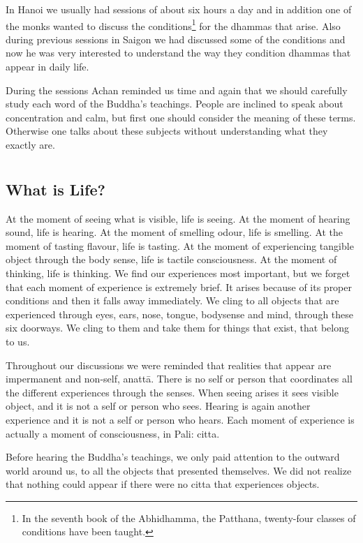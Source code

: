 In Hanoi we usually had sessions of about six hours a day and in addition one of 
the monks wanted to discuss the conditions\footnote{In the seventh book of the Abhidhamma, the Patthana, twenty-four classes of conditions have been taught.} for the dhammas that arise. Also 
during previous sessions in Saigon we had discussed some of the conditions and 
now he was very interested to understand the way they condition dhammas that 
appear in daily life. 

During the sessions Achan reminded us time and again that we should carefully 
study each word of the Buddha's teachings. People are inclined to speak about 
concentration and calm, but first one should consider the meaning of these 
terms. Otherwise one talks about these subjects without understanding what 
they exactly are. 

\chapter[What is Life?]{}
\section*{What is Life?}

At the moment of seeing what is visible, life is seeing. At the moment of hearing sound, life is hearing. At the moment of smelling odour, life is smelling. At 
the moment of tasting flavour, life is tasting. At the moment of experiencing 
tangible object through the body sense, life is tactile consciousness. At the moment of thinking, life is thinking. We find our experiences most important, but 
we forget that each moment of experience is extremely brief. It arises because 
of its proper conditions and then it falls away immediately. We cling to all objects that are experienced through eyes, ears, nose, tongue, bodysense and mind, 
through these six doorways. We cling to them and take them for things that exist, that belong to us. 

Throughout our discussions we were reminded that realities that appear are impermanent and non-self, anattā. There is no self or person that coordinates all 
the different experiences through the senses. When seeing arises it sees visible 
object, and it is not a self or person who sees. Hearing is again another experience and it is not a self or person who hears. Each moment of experience is actually a moment of consciousness, in Pali: citta. 

Before hearing the Buddha's teachings, we only paid attention to the outward 
world around us, to all the objects that presented themselves. We did not realize 
that nothing could appear if there were no citta that experiences objects. 

